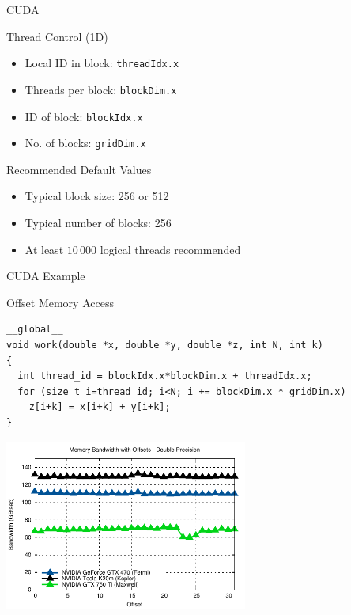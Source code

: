 
\begin{frame}[fragile]{CUDA}

\begin{block}{Thread Control (1D)}
 \begin{itemize}
  \item Local ID in block: \lstinline|threadIdx.x|
  \item Threads per block: \lstinline|blockDim.x|
  \item ID of block: \lstinline|blockIdx.x|
  \item No. of blocks: \lstinline|gridDim.x|
 \end{itemize}
\end{block}

\begin{block}{Recommended Default Values}
 \begin{itemize}
  \item Typical block size: 256 or 512
  \item Typical number of blocks: 256
  \item At least $10\,000$ logical threads recommended
 \end{itemize}
\end{block}

\end{frame}




\begin{frame}[fragile]{CUDA Example}

\begin{block}{Offset Memory Access}
  \begin{lstlisting}
__global__ 
void work(double *x, double *y, double *z, int N, int k)
{
  int thread_id = blockIdx.x*blockDim.x + threadIdx.x;
  for (size_t i=thread_id; i<N; i += blockDim.x * gridDim.x)
    z[i+k] = x[i+k] + y[i+k];
}  
  \end{lstlisting}
\end{block}

\vspace*{-0.5cm}
\begin{center}
 \includegraphics[width=0.6\textwidth]{figures/offset}
\end{center}

\end{frame}




